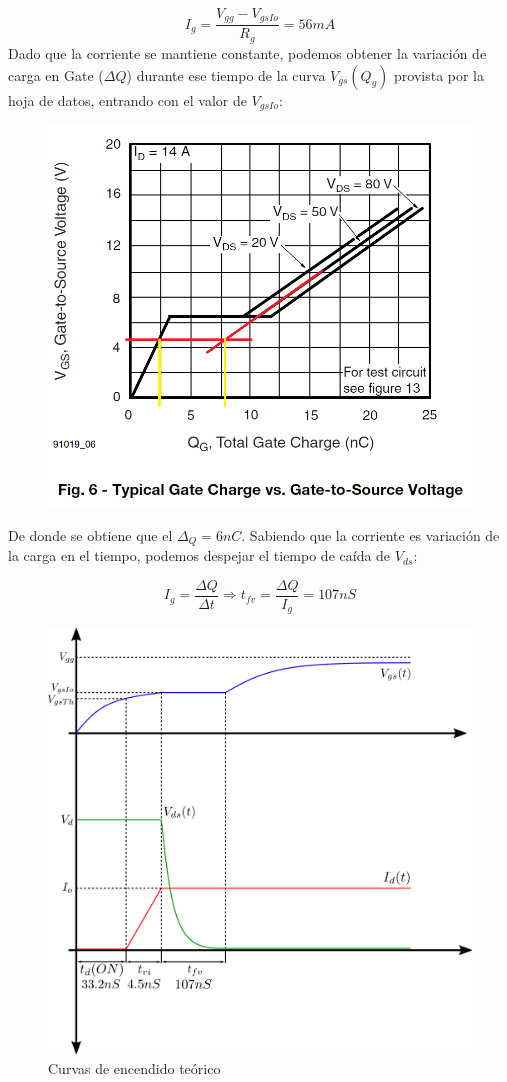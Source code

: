 \documentclass[e4_tp1_main.tex]{subfiles}
\begin{document}
\[
I_g = \frac{V_{gg} - V_{gsIo}}{R_g} = 56mA
\] 
\newpage
Dado que la corriente se mantiene constante, podemos obtener la variación de carga en Gate ($\Delta Q$) durante ese tiempo de la curva $V_{gs}(Q_g)$ provista por la hoja de datos, entrando con el valor de $V_{gsIo}$:

\begin{figure}[H]
\centering
\includegraphics[width=0.5\linewidth]{Imagenes/Punto1/Ej1-GateCharge.png}
\end{figure}

De donde se obtiene que el $\Delta_Q = 6nC$. Sabiendo que la corriente es variación de la carga en el tiempo, podemos despejar el tiempo de caída de $V_{ds}$:

\[
I_g = \frac{\Delta Q}{\Delta t} \Longrightarrow t_{fv} = \frac{\Delta Q}{I_g} = 107nS
\]

\begin{figure}[H]
\centering
\includegraphics[width=0.7\linewidth]{Imagenes/Punto1/EncendidoTeorico.png}
\caption{Curvas de encendido teórico}
\end{figure}
\end{document}
